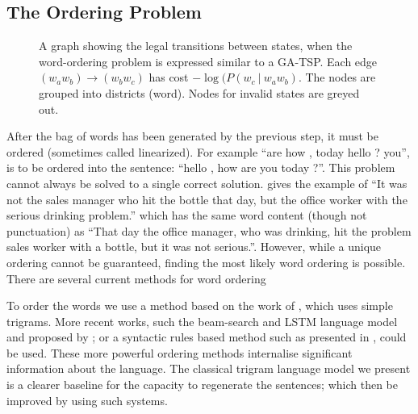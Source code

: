 \documentclass[compsoc]{IEEEtran}
\theoremstyle{plain}
\theoremstyle{definition}
\begin{document}
\subsection{The Ordering Problem} \label{ordering}
\begin{figure*}
	\begin{center}
	
	\end{center}
	\caption{\label{fig:ordergraph} A graph showing the legal transitions between states, when the word-ordering problem is expressed similar to a GA-TSP. Each edge $(w_aw_b)\to (w_bw_c)$ has cost $-\log(P(w_c\:|\:w_aw_b)$. The nodes are grouped into districts (word). Nodes for invalid states are greyed out.} 
\end{figure*}

After the bag of words has been generated by the previous step, it must be ordered (sometimes called linearized). For example ``are how , today hello ? you'', is to be ordered into the sentence: ``hello , how are you today ?''. This problem cannot always be solved to a single correct solution. \textcite{Mitchell2008}  gives the example of ``It was not the sales manager who hit the bottle that day, but the office worker with the serious drinking problem.'' which has the same word content (though not punctuation) as ``That day the office manager, who was drinking, hit the problem sales worker with a bottle, but it was not serious.''. However, while a unique ordering cannot be guaranteed, finding the most likely word ordering is possible. There are several current methods for word ordering

To order the words we use a method based on the work of \textcite{Horvat2014}, which uses simple trigrams. More recent works, such the beam-search and LSTM language model and proposed by \textcite{2016arXiv160408633S}; or a syntactic rules based method such as presented in \textcite{ZhangWordOrderSyntax}, could be used. These more powerful ordering methods internalise significant information about the language. The classical trigram language model we present is a clearer baseline for the capacity to regenerate the sentences; which then be improved by using such systems.
\end{document}
